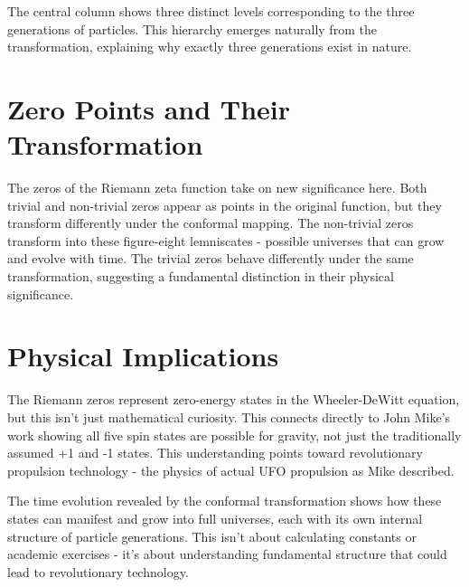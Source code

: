 \documentclass{article}
\begin{document}
The central column shows three distinct levels corresponding to the three generations of particles. This hierarchy emerges naturally from the transformation, explaining why exactly three generations exist in nature.

\section{Zero Points and Their Transformation}
The zeros of the Riemann zeta function take on new significance here. Both trivial and non-trivial zeros appear as points in the original function, but they transform differently under the conformal mapping. The non-trivial zeros transform into these figure-eight lemniscates - possible universes that can grow and evolve with time. The trivial zeros behave differently under the same transformation, suggesting a fundamental distinction in their physical significance.

\section{Physical Implications}
The Riemann zeros represent zero-energy states in the Wheeler-DeWitt equation, but this isn't just mathematical curiosity. This connects directly to John Mike's work showing all five spin states are possible for gravity, not just the traditionally assumed +1 and -1 states. This understanding points toward revolutionary propulsion technology - the physics of actual UFO propulsion as Mike described.

The time evolution revealed by the conformal transformation shows how these states can manifest and grow into full universes, each with its own internal structure of particle generations. This isn't about calculating constants or academic exercises - it's about understanding fundamental structure that could lead to revolutionary technology.
\end{document}
